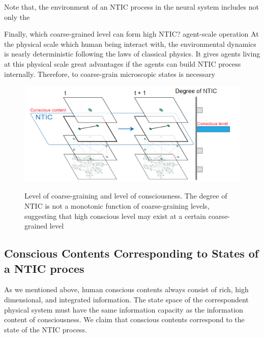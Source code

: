 \documentclass[utf8]{article}
\begin{document}
	    Note that, the environment of an NTIC process in the neural system includes not only the
        
        Finally, which coarse-grained level can form high NTIC? 
        agent-scale operation
        At the physical scale which human being interact with, the environmental dynamics is nearly deterministic following the laws of classical physics. It gives agents living at this physical scale great advantages if the agents can build NTIC process internally. Therefore, to coarse-grain microscopic states is necessary
	   
			
		\begin{figure}[H]				
    		\includegraphics[width=\textwidth]{WritingMaterials/Fig_temp/FoxitReader_2019-01-31_19-03-59.png}
    		\label{fig:LevelOfConsciousness}
    		\caption{Level of coarse-graining and level of consciousness. The degree of NTIC is not a monotonic function of coarse-graining levels, suggesting that high conscious level may exist at a certain coarse-grained level }
		\end{figure}


		\subsection{Conscious Contents Corresponding to States of a NTIC proces}
        As we mentioned above, human conscious contents always consist of rich,  high dimensional, and integrated information. The state space of the correspondent physical system must have the same information capacity as the information content of consciousness.  We claim that conscious contents correspond to the state of the NTIC process. 
        
\end{document}
